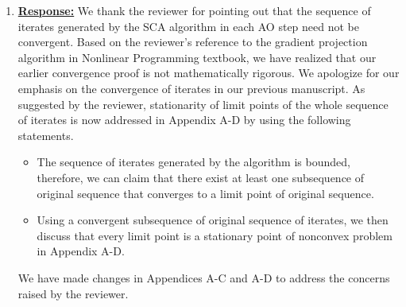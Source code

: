 \begin{enumerate}
	
	\item {}

	\vspace{1eM}
	\underline{\textbf{Response:}} We thank the reviewer for pointing out that the sequence of iterates generated by the \ac{SCA} algorithm in each \ac{AO} step need not be convergent. Based on the reviewer's reference to the gradient projection algorithm in Nonlinear Programming textbook, we have realized that our earlier convergence proof is not mathematically rigorous. We apologize for our emphasis on the convergence of iterates in our previous manuscript. As suggested by the reviewer, stationarity of limit points of the whole sequence of iterates is now addressed in Appendix A-D by using the following statements. 
	\begin{itemize}
		\item The sequence of iterates generated by the algorithm is bounded, therefore, we can claim that there exist at least one subsequence of original sequence that converges to a limit point of original sequence.
		\item Using a convergent subsequence of original sequence of iterates, we then discuss that every limit point is a stationary point of nonconvex problem in Appendix A-D.
	\end{itemize}
	
	We have made changes in Appendices A-C and A-D to address the concerns raised by the reviewer.
				

\end{enumerate}
